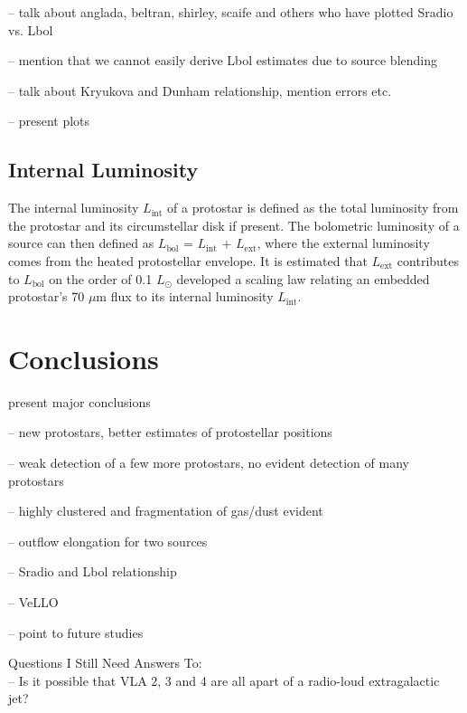 \documentclass[apj]{emulateapj}
\begin{document}
-- talk about anglada, beltran, shirley, scaife and others who have plotted Sradio vs. Lbol

-- mention that we cannot easily derive Lbol estimates due to source blending

-- talk about Kryukova and Dunham relationship, mention errors etc.

-- present plots

\subsection{Internal Luminosity}
\label{sec:vellos}
The internal luminosity $L_{\text{int}}$ of a protostar is defined as the total luminosity from the protostar and its circumstellar disk if present. The bolometric luminosity of a source can then defined as $L_{\text{bol}}$ = $L_{\text{int}}$ + $L_{\text{ext}}$, where the external luminosity comes from the heated protostellar envelope. It is estimated that $L_{\text{ext}}$ contributes to $L_{\text{bol}}$ on the order of 0.1 $L_{\odot}$ \citet{Dunham08} developed a scaling law relating an embedded protostar's 70 $\mu$m flux to its internal luminosity $L_{\text{int}}$.

\citep{Dunham13}

\section{Conclusions}
\label{sec:conclusions}

present major conclusions

-- new protostars, better estimates of protostellar positions

-- weak detection of a few more protostars, no evident detection of many protostars

-- highly clustered and fragmentation of gas/dust evident

-- outflow elongation for two sources

-- Sradio and Lbol relationship

-- VeLLO

-- point to future studies

		
{}



\appendix
 
{\large Questions I Still Need Answers To:} \\[.1in]

-- Is it possible that VLA 2, 3 and 4 are all apart of a radio-loud extragalactic jet? \\
\end{document}

